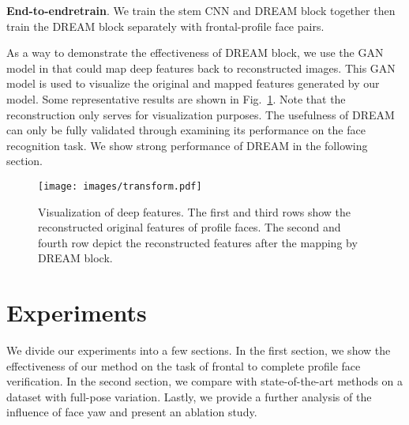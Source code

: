 \documentclass[10pt,twocolumn,letterpaper]{article}
\begin{document}
\noindent
\textbf{End-to-endretrain}.
We train the stem CNN and DREAM block together then train the DREAM block separately with frontal-profile face pairs. 


As a way to demonstrate the effectiveness of DREAM block, we use the GAN model in \cite{nguyen2016plug} that could map deep features back to reconstructed images. This GAN model is used to visualize the original and mapped features generated by our model. Some representative results are shown in Fig.~\ref{fig:transform}. Note that the reconstruction only serves for visualization purposes. The usefulness of DREAM can only be fully validated through examining its performance on the face recognition task. We show strong performance of DREAM in the following section.
 
\begin{figure}[t]
\begin{center}
   \texttt{[image: images/transform.pdf]}
\end{center}
\vskip -0.2cm
   \caption{Visualization of deep features. The first and third rows show the reconstructed original features of profile faces. The second and fourth row depict the reconstructed features after the mapping by DREAM block.}
\label{fig:transform}
\end{figure} 
\vskip -0.2cm
\noindent

\section{Experiments}
\label{sec:experiments}






We divide our experiments into a few sections. In the first section, we show the effectiveness of our method on the task of frontal to complete profile face verification.
In the second section, we compare with state-of-the-art methods on a dataset with full-pose variation. Lastly, we provide a further analysis of the influence of face yaw and present an ablation study.
\end{document}

